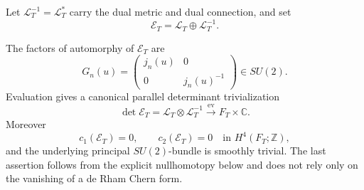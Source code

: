 Let \(\mathscr L_T^{-1}=\mathscr L_T^*\) carry the dual metric and dual
connection, and set
\begin{equation}
 \mathscr E_T=\mathscr L_T\oplus\mathscr L_T^{-1}.
 \label{cusp-magnetic-rank-two-bundle}
\end{equation}

\begin{proposition}
\label{cusp-magnetic-su2-triviality}
The factors of automorphy of \(\mathscr E_T\) are
\[
 G_n(u)=\begin{pmatrix}j_n(u)&0\\0&j_n(u)^{-1}\end{pmatrix}\in SU(2).
\]
Evaluation gives a canonical parallel determinant trivialization
\[
 \det\mathscr E_T=\mathscr L_T\otimes\mathscr L_T^{-1}
 \xrightarrow{\ \mathrm{ev}\ }F_T\times\mathbb C.
\]
Moreover
\[
 c_1(\mathscr E_T)=0,
 \qquad
 c_2(\mathscr E_T)=0\quad\text{in }H^4(F_T;\mathbb Z),
\]
and the underlying principal \(SU(2)\)-bundle is smoothly trivial.  The
last assertion follows from the explicit nullhomotopy below and does not
rely only on the vanishing of a de Rham Chern form.
\end{proposition}

